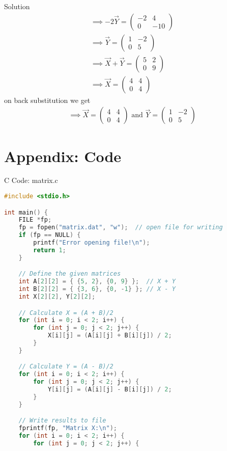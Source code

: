 \documentclass{beamer}
\numberwithin{equation}{section}
\theoremstyle{remark}
\begin{document}
\begin{frame}{Solution}
\begin{align}
\implies -2\Vec{Y}=\begin{pmatrix} -2 & 4 \\ 0 & -10 \end{pmatrix}\\
\implies \Vec{Y}=\begin{pmatrix} 1 & -2 \\ 0 & 5 \end{pmatrix}\\
\implies \Vec{X}+\Vec{Y}=\begin{pmatrix} 5 & 2 \\ 0 & 9 \end{pmatrix}\\
\implies \Vec{X}=\begin{pmatrix} 4 & 4 \\ 0 & 4 \end{pmatrix}
\end{align}
on back substitution we get
    \begin{align}
    \implies \Vec{X}=\begin{pmatrix}
    4 & 4\\
    0 & 4
\end{pmatrix} \text{ and } \Vec{Y}=\begin{pmatrix}
    1 & -2\\
    0 & 5
\end{pmatrix}
\end{align}

\end{frame}
\section*{Appendix: Code}

\begin{frame}[fragile]{C Code: matrix.c}
\begin{lstlisting}[language=C]
#include <stdio.h>

int main() {
    FILE *fp;
    fp = fopen("matrix.dat", "w");  // open file for writing
    if (fp == NULL) {
        printf("Error opening file!\n");
        return 1;
    }

    // Define the given matrices
    int A[2][2] = { {5, 2}, {0, 9} };  // X + Y
    int B[2][2] = { {3, 6}, {0, -1} }; // X - Y
    int X[2][2], Y[2][2];

    // Calculate X = (A + B)/2
    for (int i = 0; i < 2; i++) {
        for (int j = 0; j < 2; j++) {
            X[i][j] = (A[i][j] + B[i][j]) / 2;
        }
    }

    // Calculate Y = (A - B)/2
    for (int i = 0; i < 2; i++) {
        for (int j = 0; j < 2; j++) {
            Y[i][j] = (A[i][j] - B[i][j]) / 2;
        }
    }

    // Write results to file
    fprintf(fp, "Matrix X:\n");
    for (int i = 0; i < 2; i++) {
        for (int j = 0; j < 2; j++) {
           
\end{lstlisting}
\end{frame}
\end{document}
